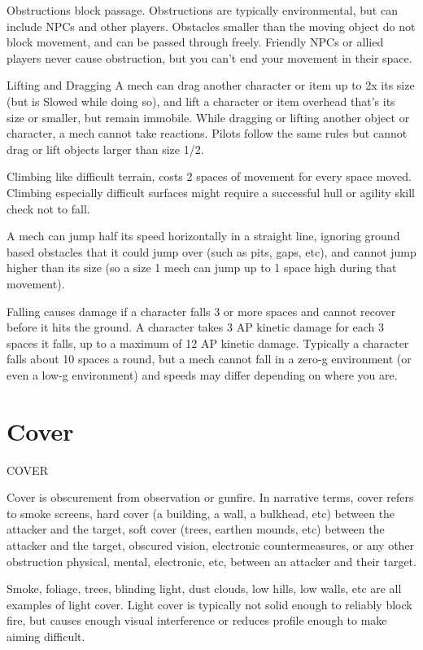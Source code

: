 Obstructions block passage. Obstructions are typically environmental, but can include NPCs
and other players. Obstacles smaller than the moving object do not block movement, and
can be passed through freely. Friendly NPCs or allied players never cause obstruction, but
you can’t end your movement in their space.


Lifting and  Dragging
A mech can drag another character or item up to 2x its size (but is Slowed while doing so), and
lift a character or item overhead that’s its size or smaller, but remain immobile. While dragging or
lifting another object or character, a mech cannot take reactions. Pilots follow the same rules but
cannot drag or lift objects larger than size 1/2.


Climbing like difficult terrain, costs 2 spaces of movement for every space moved. Climbing
especially difficult surfaces might require a successful hull or agility skill check not to fall.


A mech can jump half its speed horizontally in a straight line, ignoring ground based obstacles
that it could jump over (such as pits, gaps, etc), and cannot jump higher than its size (so a size 1
mech can jump up to 1 space high during that movement).



Falling causes damage if a character falls 3 or more spaces and cannot recover before it hits the
ground. A character takes 3 AP kinetic damage for each 3 spaces it falls, up to a maximum of 12
AP kinetic damage. Typically a character falls about 10 spaces a round, but a mech cannot fall in
a zero-g environment (or even a low-g environment) and speeds may differ depending on where
you are.

\section{Cover}
                                                     COVER

Cover is obscurement from observation or gunfire. In narrative terms, cover refers to smoke
screens, hard cover (a building, a wall, a bulkhead, etc) between the attacker and the target, soft
cover (trees, earthen mounds, etc) between the attacker and the target, obscured vision,
electronic countermeasures, or any other obstruction physical, mental, electronic, etc, between an
attacker and their target.




Smoke, foliage, trees, blinding light, dust clouds, low hills, low walls, etc are all examples of light
cover. Light cover is typically not solid enough to reliably block fire, but causes enough visual
interference or reduces profile enough to make aiming difficult.

